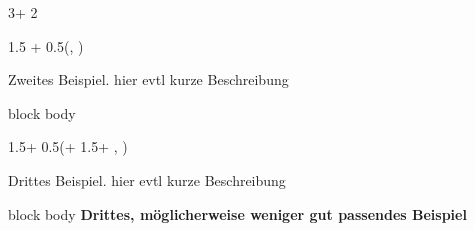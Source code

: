 \documentclass{beamer}
\newlength{\blockThree}
\begin{document}
\begin{frame}[t]
\begin{textblock*}{3\colwidth + 2\colsep}
\end{textblock*}



\begin{textblock*}{1.5 \colwidth + 0.5\colsep}(\leftmargin, \blockThree)

\begin{alertblock}{%
	\begin{minipage}[b]{60pt}
		\RaggedRight
		\noindent\hspace{-10pt}
	\end{minipage}%
	\begin{minipage}[b]{2\colwidth+\colsep-125pt}\strut%
		Zweites Beispiel.\; {\mdseries hier evtl kurze Beschreibung}
	\end{minipage}%
}
	\begin{beamercolorbox}[
		ht = 19.75cm, 
		wd = 0.9\linewidth, 
		center
		]{block body}
		\par
	\end{beamercolorbox}
\end{alertblock}

\end{textblock*}




\begin{textblock*}{1.5\colwidth + 0.5\colsep}(\leftmargin + 1.5\colwidth + \colsep, \blockThree)

\begin{alertblock}{%
	\begin{minipage}[b]{60pt}
		\RaggedRight
		\noindent\hspace{-10pt}
	\end{minipage}%
	\begin{minipage}[b]{2\colwidth+\colsep-125pt}\strut%
		Drittes Beispiel.\; {\mdseries hier evtl kurze Beschreibung}
	\end{minipage}%
}
	\begin{beamercolorbox}[
		ht = 19.75cm, 
		wd = 0.975\linewidth, 
		center
		]{block body}
		\textcolor{SpotColor}{\textbf{Drittes, möglicherweise weniger gut passendes Beispiel}}\\[46pt]
	\end{beamercolorbox}
\end{alertblock}


\end{textblock*}
\end{frame}
\end{document}
